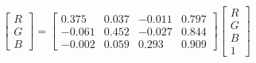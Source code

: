 \begin{equation}
\begin{bmatrix}
  R \\ G \\ B 
\end{bmatrix}=
\left[\begin{matrix}0.375 & 0.037 & -0.011 & 0.797\\ 
-0.061 & 0.452 & -0.027 & 0.844\\ 
-0.002 & 0.059 & 0.293 & 0.909\end{matrix}\right]
\begin{bmatrix}
  R \\ G \\ B \\ 1 
\end{bmatrix}
\end{equation}
